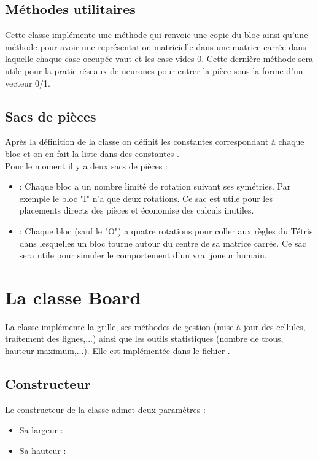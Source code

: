 \subsection{Méthodes utilitaires}
Cette classe implémente une méthode  qui renvoie une copie du bloc ainsi qu'une méthode  pour avoir une représentation matricielle dans une matrice carrée dans laquelle chaque case occupée vaut  et les case vides 0. Cette dernière méthode sera utile pour la pratie réseaux de neurones pour entrer la pièce sous la forme d'un vecteur 0/1. 

\subsection{Sacs de pièces}
Après la définition de la classe  on définit les constantes correspondant à chaque bloc et on en fait la liste dans des constantes .\\
Pour le moment il y a deux sacs de pièces :
\begin{itemize}
	\item {} : Chaque bloc a un nombre limité de rotation suivant ses symétries. Par exemple le bloc "I" n'a que deux rotations. Ce sac est utile pour les placements directs des pièces et économise des calculs inutiles.
	\item {} : Chaque bloc (sauf le "O") a quatre rotations pour coller aux règles du Tétris dans lesquelles un bloc tourne autour du centre de sa matrice carrée. Ce sac sera utile pour simuler le comportement d'un vrai joueur humain.	
\end{itemize}

\section{La classe Board}
La classe  implémente la grille, ses méthodes de gestion (mise à jour des cellules, traitement des lignes,...) ainsi que les outils statistiques (nombre de trous, hauteur maximum,...). Elle est implémentée dans le fichier .

\subsection{Constructeur}
Le constructeur de la classe  admet deux paramètres :
\begin{itemize}
	\item Sa largeur : 
	\item Sa hauteur : 
\end{itemize}

